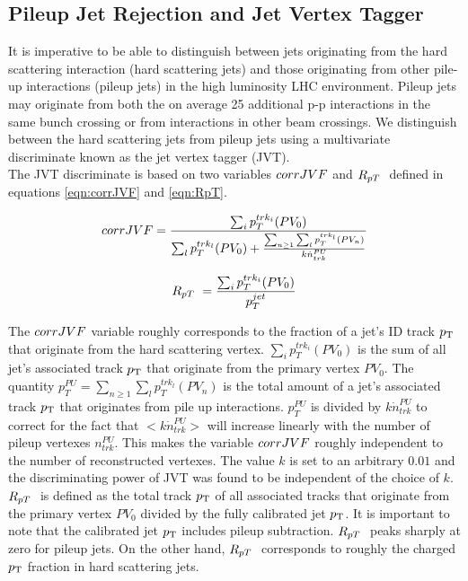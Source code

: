 \subsection{Pileup Jet Rejection and Jet Vertex Tagger}
\label{sec:jet:JVT}

\indent It is imperative to be able to distinguish between jets originating from the hard scattering interaction (hard scattering jets) and those originating from other pile-up interactions (pileup jets) in the high luminosity LHC environment.  Pileup jets may originate from both the on average 25 additional p-p interactions in the same bunch crossing or from interactions in other beam crossings.  We distinguish between the hard scattering jets from pileup jets using a multivariate discriminate known as the jet vertex tagger (JVT).\cite{JVT} \\

\indent The JVT discriminate is based on two variables $corrJVF$ and $R_{pT}\ $ defined in equations \ref{eqn:corrJVF} and \ref{eqn:RpT}.

\begin{equation}
corrJVF = \frac{\sum_i p_T^{trk_i} (PV_0) }{ \sum_l p_T^{trk_l} (PV_0) + \frac{\sum_{n\ge1} \sum_l p_T^{trk_l} (PV_n) }{k\dot n^{PU}_{trk}} }
\label{eqn:JVF}
\end{equation}

\begin{equation}
R_{pT}\  = \frac{\sum_i p_T^{trk_i} (PV_0) }{ p_T^{jet} }
\label{eqn:RpT}
\end{equation}

\indent The $corrJVF$ variable roughly corresponds to the fraction of a jet's ID track $p_{\mathrm{T}}$ that originate from the hard scattering vertex.  $\sum_i p_T^{trk_i} (PV_0)$ is the sum of all jet's associated track $p_{\mathrm{T}}$ that originate from the primary vertex $PV_0$.  The quantity $p^{PU}_T = \sum_{n\ge1} \sum_l p_T^{trk_l} (PV_n)$ is the total amount of a jet's associated track $p_{\mathrm{T}}$ that originates from pile up interactions.  $p^{PU}_T$ is divided by $k\dot n^{PU}_{trk}$ to correct for the fact that $<k\dot n^{PU}_{trk}>$ will increase linearly with the number of pileup vertexes $n^{PU}_{trk}$.  This makes the variable $corrJVF$ roughly independent to the number of reconstructed vertexes. The value $k$ is set to an arbitrary $0.01$ and the discriminating power of JVT was found to be independent of the choice of $k$.\\

\indent $R_{pT}\ $ is defined as the total track $p_{\mathrm{T}}$ of all associated tracks that originate from the primary vertex $PV_0$ divided by the fully calibrated jet $p_{\mathrm{T}}$. It is important to note that the calibrated jet $p_{\mathrm{T}}$ includes pileup subtraction.  $R_{pT}\ $ peaks sharply at zero for pileup jets.  On the other hand, $R_{pT}\ $ corresponds to roughly the charged $p_{\mathrm{T}}$ fraction in hard scattering jets.  \\

